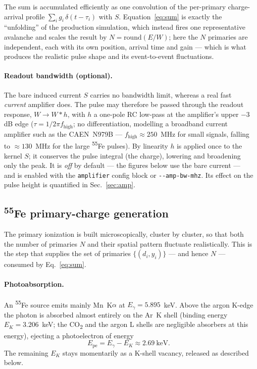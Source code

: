 \documentclass[11pt,a4paper]{article}
\newcommand{\Fe}{\textsuperscript{55}Fe}
\newcommand{\co}{CO\textsubscript{2}}
\begin{document}
The sum is accumulated efficiently as one convolution of the per-primary charge-arrival profile
$\sum_i g_i\,\delta(t-\tau_i)$ with $S$. Equation~\eqref{eq:sum} is exactly the ``unfolding'' of the
production simulation, which instead fires one representative avalanche and scales the result by
$N=\mathrm{round}(E/W)$; here the $N$ primaries are independent, each with its own position, arrival time
and gain --- which is what produces the realistic pulse shape and its event-to-event fluctuations.

\paragraph{Readout bandwidth (optional).} The bare induced current $S$ carries no bandwidth limit,
whereas a real fast \emph{current} amplifier does. The pulse may therefore be passed through the readout
response, $W\to W*h$, with $h$ a one-pole RC low-pass at the amplifier's upper $-3$\,dB edge
($\tau=1/2\pi f_\mathrm{high}$; no differentiation, modelling a broadband current amplifier such as the
CAEN~N979B --- $f_\mathrm{high}\approx250$~MHz for small signals, falling to $\approx130$~MHz for the
large \Fe{} pulses). By linearity $h$ is applied once to the kernel $S$; it conserves the pulse integral
(the charge), lowering and broadening only the peak. It is \emph{off} by default --- the figures below
use the bare current --- and is enabled with the \texttt{amplifier} config block or
\texttt{-{}-amp-bw-mhz}. Its effect on the pulse height is quantified in Sec.~\ref{sec:amp}.

\subsection{\Fe{} primary-charge generation}
\label{sec:primary}
The primary ionization is built microscopically, cluster by cluster, so that both the number of
primaries $N$ and their spatial pattern fluctuate realistically. This is the step that supplies the set
of primaries $\{(d_i,y_i)\}$ --- and hence $N$ --- consumed by Eq.~\eqref{eq:sum}.

\paragraph{Photoabsorption.} An \Fe{} source emits mainly Mn~K$\alpha$ at $E_\gamma=5.895$~keV. Above the
argon K-edge the photon is absorbed almost entirely on the Ar~K shell (binding energy $E_K=3.206$~keV;
the \co{} and the argon L shells are negligible absorbers at this energy), ejecting a photoelectron of
energy
\begin{equation*}
  E_\mathrm{pe} = E_\gamma - E_K \approx 2.69~\text{keV}.
\end{equation*}
The remaining $E_K$ stays momentarily as a K-shell vacancy, released as described below.
\end{document}
